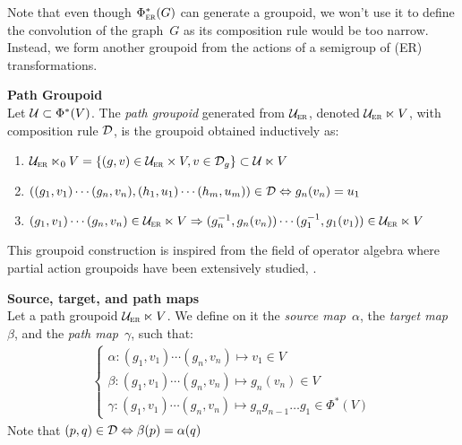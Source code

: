 Note that even though $\Phi_{\operatorname{\textsc{er}}}^*(G)$ can generate a groupoid, we won't use it to define the convolution of the graph~$G$ as its composition rule would be too narrow. Instead, we form another groupoid from the actions of a semigroup of (ER) transformations.

\begin{definition}\textbf{Path Groupoid}\\
Let $\mathcal{U} \subset \Phi^*(V)$. The \emph{path groupoid} generated from $\mathcal{U}_{\operatorname{\textsc{er}}}$, denoted $\mathcal{U}_{\operatorname{\textsc{er}}} \ltimes V$, with composition rule $\mathcal{D}$, is the groupoid obtained inductively as:
\begin{enumerate}
  \item $\mathcal{U}_{\operatorname{\textsc{er}}} \ltimes_0 V = \{(g,v) \in \mathcal{U}_{\operatorname{\textsc{er}}} \times V, v \in \mathcal{D}_g \} \subset \mathcal{U} \ltimes V$
  \item $((g_1,v_1) \cdots (g_n,v_n) , (h_1,u_1) \cdots (h_m,u_m)) \in \mathcal{D} \Leftrightarrow g_n(v_n) = u_1$
  \item $(g_1,v_1) \cdots (g_n,v_n) \in \mathcal{U}_{\operatorname{\textsc{er}}} \ltimes V \Rightarrow (g_n^{-1}, g_n(v_n)) \cdots (g_1^{-1}, g_1(v_1)) \in \mathcal{U}_{\operatorname{\textsc{er}}} \ltimes V$
\end{enumerate}
\end{definition}

\begin{remark}
This groupoid construction is inspired from the field of operator algebra where partial action groupoids have been extensively studied, \eg \cite{nica1994groupoid,exel1998partial,li2016partial}.
\end{remark}

\begin{definition}\textbf{Source, target, and path maps}\\
Let a path groupoid $\mathcal{U}_{\operatorname{\textsc{er}}} \ltimes V$. We define on it the \emph{source map}~$\alpha$, the \emph{target map}~$\beta$, and the \emph{path map}~$\gamma$, such that:
\begin{gather*}
\begin{cases}
  \alpha: (g_1,v_1) \cdots (g_n,v_n) \mapsto v_1 \in V\\
  \beta: (g_1,v_1) \cdots (g_n,v_n) \mapsto g_n(v_n) \in V\\
  \gamma: (g_1,v_1) \cdots (g_n,v_n) \mapsto g_ng_{n-1}\ldots g_1 \in \Phi^*(V)
\end{cases}
\end{gather*}
Note that $(p,q) \in \mathcal{D} \Leftrightarrow \beta(p) = \alpha(q)$
\end{definition}


